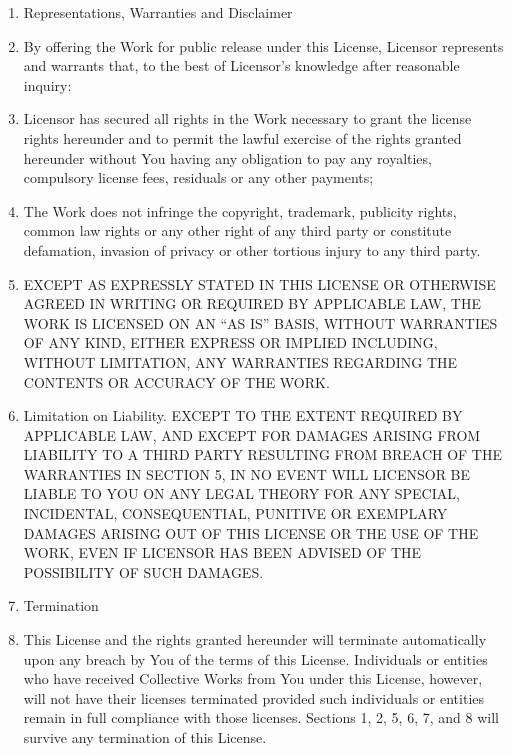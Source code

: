\begin{enumerate}
\item
  Representations, Warranties and Disclaimer

\item
  By offering the Work for public release under this License,
  Licensor represents and warrants that, to the best of Licensor's
  knowledge after reasonable inquiry:

\item
  Licensor has secured all rights in the Work necessary to grant the
  license rights hereunder and to permit the lawful exercise of the
  rights granted hereunder without You having any obligation to pay
  any royalties, compulsory license fees, residuals or any other
  payments;

\item
  The Work does not infringe the copyright, trademark, publicity
  rights, common law rights or any other right of any third party or
  constitute defamation, invasion of privacy or other tortious injury
  to any third party.

\item
  EXCEPT AS EXPRESSLY STATED IN THIS LICENSE OR OTHERWISE AGREED IN
  WRITING OR REQUIRED BY APPLICABLE LAW, THE WORK IS LICENSED ON AN
  ``AS IS'' BASIS, WITHOUT WARRANTIES OF ANY KIND, EITHER EXPRESS OR
  IMPLIED INCLUDING, WITHOUT LIMITATION, ANY WARRANTIES REGARDING THE
  CONTENTS OR ACCURACY OF THE WORK.

\item
  Limitation on Liability. EXCEPT TO THE EXTENT REQUIRED BY
  APPLICABLE LAW, AND EXCEPT FOR DAMAGES ARISING FROM LIABILITY TO A
  THIRD PARTY RESULTING FROM BREACH OF THE WARRANTIES IN SECTION 5,
  IN NO EVENT WILL LICENSOR BE LIABLE TO YOU ON ANY LEGAL THEORY FOR
  ANY SPECIAL, INCIDENTAL, CONSEQUENTIAL, PUNITIVE OR EXEMPLARY
  DAMAGES ARISING OUT OF THIS LICENSE OR THE USE OF THE WORK, EVEN IF
  LICENSOR HAS BEEN ADVISED OF THE POSSIBILITY OF SUCH DAMAGES.

\item
  Termination

\item
  This License and the rights granted hereunder will terminate
  automatically upon any breach by You of the terms of this License.
  Individuals or entities who have received Collective Works from You
  under this License, however, will not have their licenses
  terminated provided such individuals or entities remain in full
  compliance with those licenses. Sections 1, 2, 5, 6, 7, and 8 will
  survive any termination of this License.


\end{enumerate}
